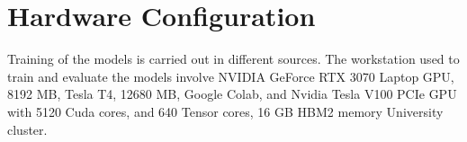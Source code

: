     \section{Hardware Configuration}
    
    Training of the models is carried out in different sources. The workstation used to train and evaluate the models involve NVIDIA GeForce RTX 3070 Laptop GPU, 8192 MB, Tesla T4, 12680 MB, Google Colab, and Nvidia Tesla V100 PCIe GPU with 5120 Cuda cores, and 640 Tensor cores, 16 GB HBM2 memory University cluster. 
    

